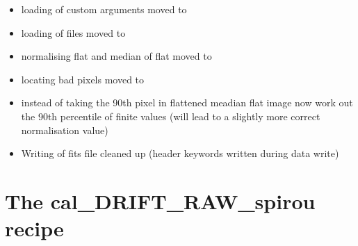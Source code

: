 \begin{itemize}
	\item loading of custom arguments moved to 

	\item loading of files moved to 

	\item normalising flat and median of flat moved to 

	\item locating bad pixels moved to 

	\item instead of taking the 90th pixel in flattened meadian flat image now work out the 90th percentile of finite values (will lead to a slightly more correct normalisation value)

	\item Writing of fits file cleaned up (header keywords written during data write)
\end{itemize}


\section{The cal\_DRIFT\_RAW\_spirou recipe}
\label{ch:changelog:At4:cal_DRIFT_RAW_spirou}

